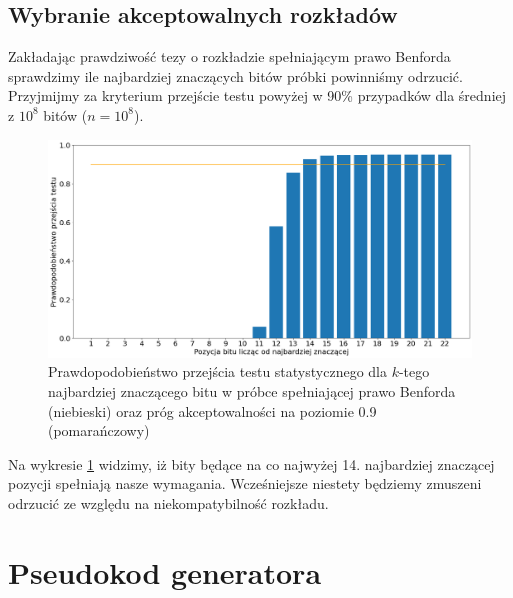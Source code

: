 \subsection{Wybranie akceptowalnych rozkładów}
Zakładając prawdziwość tezy o rozkładzie spełniającym prawo Benforda sprawdzimy ile najbardziej znaczących bitów próbki powinniśmy odrzucić. Przyjmijmy za kryterium przejście testu powyżej w 90\% przypadków dla średniej z $10^8$ bitów ($n=10^8$).
\begin{figure}[!htp]
    \centering
    \includegraphics[width=15cm]{probabilty_of_passing_benford}
    \caption{Prawdopodobieństwo przejścia testu statystycznego dla $k$-tego najbardziej znaczącego bitu w próbce spełniającej prawo Benforda (niebieski) oraz próg akceptowalności na poziomie 0.9 (pomarańczowy)}
    \label{fig:probabilty_of_passing_benford}
\end{figure}
Na wykresie \ref{fig:probabilty_of_passing_benford} widzimy, iż bity będące na co najwyżej 14. najbardziej znaczącej pozycji spełniają nasze wymagania. Wcześniejsze niestety będziemy zmuszeni odrzucić ze względu na niekompatybilność rozkładu.
\section{Pseudokod generatora}

